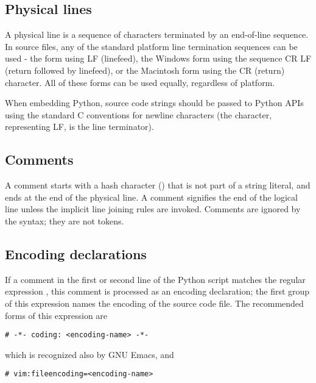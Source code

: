 \subsection{Physical lines\label{physical}}

A physical line is a sequence of characters terminated by an end-of-line
sequence.  In source files, any of the standard platform line
termination sequences can be used - the \UNIX{} form using \ASCII{} LF
(linefeed), the Windows form using the \ASCII{} sequence CR LF (return
followed by linefeed), or the Macintosh form using the \ASCII{} CR
(return) character.  All of these forms can be used equally, regardless
of platform.

When embedding Python, source code strings should be passed to Python
APIs using the standard C conventions for newline characters (the
 character, representing \ASCII{} LF, is the line
terminator).


\subsection{Comments\label{comments}}

A comment starts with a hash character (\code{\#}) that is not part of
a string literal, and ends at the end of the physical line.  A comment
signifies the end of the logical line unless the implicit line joining
rules are invoked.
Comments are ignored by the syntax; they are not tokens.


\subsection{Encoding declarations\label{encodings}}

If a comment in the first or second line of the Python script matches
the regular expression , this comment is
processed as an encoding declaration; the first group of this
expression names the encoding of the source code file. The recommended
forms of this expression are

\begin{verbatim}
# -*- coding: <encoding-name> -*-
\end{verbatim}

which is recognized also by GNU Emacs, and

\begin{verbatim}
# vim:fileencoding=<encoding-name>
\end{verbatim}

